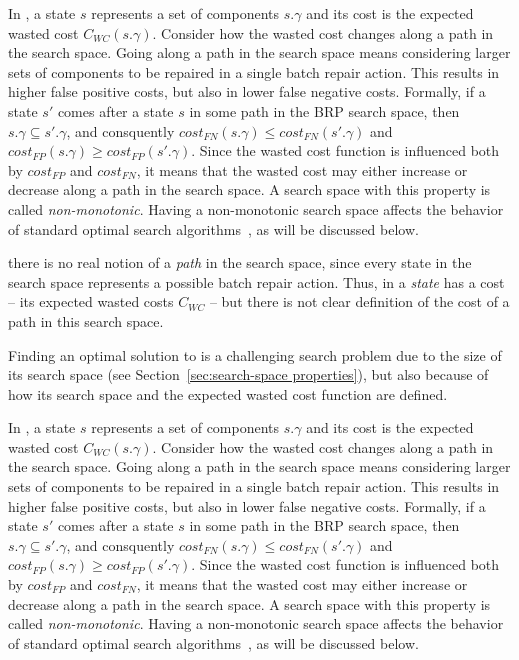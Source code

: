 {In \brpswc{}, a state $s$ represents a set of components $s.\gamma$ and its cost is the expected wasted cost $C_{WC}(s.\gamma)$. Consider how the wasted cost changes along a path in the search space. Going along a path in the search space means considering larger sets of components to be repaired in a single batch repair action. This results in higher false positive costs, but also in lower false negative costs. Formally, if a state $s'$ comes after a state $s$ in some path in the BRP search space, 
then $s.\gamma\subseteq s'.\gamma$, and consquently 
$cost_{FN}(s.\gamma)\leq cost_{FN}(s'.\gamma)$ 
and $cost_{FP}(s.\gamma)\geq cost_{FP}(s'.\gamma)$. 
Since the wasted cost function is influenced both by $cost_{FP}$ and $cost_{FN}$, it means that the wasted cost may either increase or decrease along a path in the search space. A search space with this property is called \emph{non-monotonic}. Having a non-monotonic search space affects the behavior of standard optimal search algorithms~\cite{stern2014max}, as will be discussed below. 



there is no real notion of a \emph{path} in the \brpswc{} search space, since every state in the \brpswc{} search space represents a possible batch repair action. Thus, in \brpswc{} a \emph{state} has a cost -- its expected wasted costs $C_{WC}$ -- but there is not clear definition of the cost of a path in this search space.













Finding an optimal solution to \brpswc{} is a challenging search problem due to the size of its search space (see Section~\ref{sec:search-space properties}), but also because of how its search space and the expected wasted cost function are defined. 

In \brpswc{}, a state $s$ represents a set of components $s.\gamma$ and its cost is the expected wasted cost $C_{WC}(s.\gamma)$. Consider how the wasted cost changes along a path in the search space. Going along a path in the search space means considering larger sets of components to be repaired in a single batch repair action. This results in higher false positive costs, but also in lower false negative costs. Formally, if a state $s'$ comes after a state $s$ in some path in the BRP search space, 
then $s.\gamma\subseteq s'.\gamma$, and consquently 
$cost_{FN}(s.\gamma)\leq cost_{FN}(s'.\gamma)$ 
and $cost_{FP}(s.\gamma)\geq cost_{FP}(s'.\gamma)$. 
Since the wasted cost function is influenced both by $cost_{FP}$ and $cost_{FN}$, it means that the wasted cost may either increase or decrease along a path in the search space. A search space with this property is called \emph{non-monotonic}. Having a non-monotonic search space affects the behavior of standard optimal search algorithms~\cite{stern2014max}, as will be discussed below. 


}
